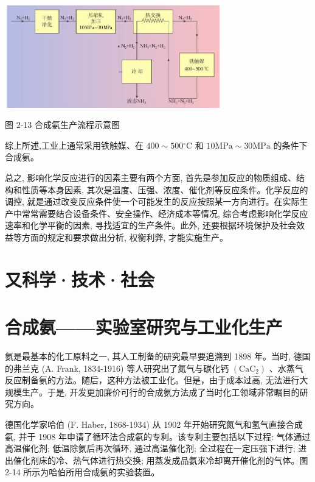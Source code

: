 \documentclass[10pt]{article}
\begin{document}

\begin{center}
\includegraphics[max width=0.7\textwidth]{images/0190da9d-8bfd-732f-bc2c-0b21d0f13b91_54_335795.jpg}
\end{center}

图 2-13 合成氨生产流程示意图

综上所述,工业上通常采用铁触媒、在 \({400} \sim {500}{}^{ \circ }\mathrm{C}\) 和 \({10}\mathrm{{MPa}} \sim {30}\mathrm{{MPa}}\) 的条件下合成氨。

总之, 影响化学反应进行的因素主要有两个方面, 首先是参加反应的物质组成、结构和性质等本身因素, 其次是温度、压强、浓度、催化剂等反应条件。化学反应的调控, 就是通过改变反应条件使一个可能发生的反应按照某一方向进行。在实际生产中常常需要结合设备条件、安全操作、经济成本等情况, 综合考虑影响化学反应速率和化学平衡的因素, 寻找适宜的生产条件。此外, 还要根据环境保护及社会效益等方面的规定和要求做出分析, 权衡利弊, 才能实施生产。

\section*{又科学·技术·社会}

\section*{合成氨——实验室研究与工业化生产}

氨是最基本的化工原料之一, 其人工制备的研究最早要追溯到 1898 年。当时, 德国的弗兰克 (A. Frank, 1834-1916) 等人研究出了氮气与碳化钙 \(\left( {\mathrm{{CaC}}}_{2}\right)\) 、水蒸气反应制备氨的方法。随后，这种方法被工业化。但是，由于成本过高, 无法进行大规模生产。于是, 开发更加廉价可行的合成氨方法成了当时化工领域非常瞩目的研究方向。

德国化学家哈伯 (F. Haber, 1868-1934) 从 1902 年开始研究氮气和氢气直接合成氨, 并于 1908 年申请了循环法合成氨的专利。该专利主要包括以下过程: 气体通过高温催化剂; 低温除氨后再次循环, 通过高温催化剂; 全过程在一定压强下进行; 进出催化剂床的冷、热气体进行热交换; 用蒸发成品氨来冷却离开催化剂的气体。图 2-14 所示为哈伯所用合成氨的实验装置。
\end{document}
